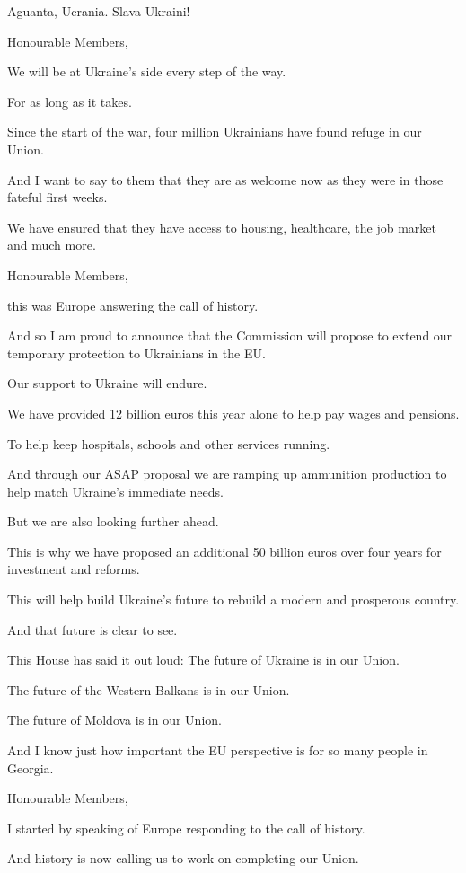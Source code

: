 \documentclass[a4paper,11pt]{article}
\begin{document}
Aguanta, Ucrania. Slava Ukraini!

 

Honourable Members,

We will be at Ukraine's side every step of the way.

For as long as it takes.

Since the start of the war, four million Ukrainians have found refuge in our Union.

And I want to say to them that they are as welcome now as they were in those fateful first weeks.

We have ensured that they have access to housing, healthcare, the job market and much more.

 

Honourable Members,

this was Europe answering the call of history.

And so I am proud to announce that the Commission will propose to extend our temporary protection to Ukrainians in the EU. 

Our support to Ukraine will endure.

We have provided 12 billion euros this year alone to help pay wages and pensions.

To help keep hospitals, schools and other services running. 

And through our ASAP proposal we are ramping up ammunition production to help match Ukraine's immediate needs.

But we are also looking further ahead.

This is why we have proposed an additional 50 billion euros over four years for investment and reforms.

This will help build Ukraine's future to rebuild a modern and prosperous country.

And that future is clear to see.

This House has said it out loud: The future of Ukraine is in our Union.

The future of the Western Balkans is in our Union.

The future of Moldova is in our Union.

And I know just how important the EU perspective is for so many people in Georgia.

 

Honourable Members,

I started by speaking of Europe responding to the call of history. 

And history is now calling us to work on completing our Union.
\end{document}
